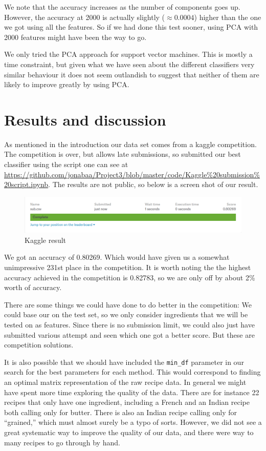 \documentclass[parskip=half]{scrartcl}
\theoremstyle{definition}
\theoremstyle{remark}
\newcommand{\funcname}[1]{{\color{blue}{\texttt{#1}}}}
\newcommand{\varname}[1]{\texttt{#1}}
\begin{document}
We note that the accuracy increases as the number of components goes up.
However, the accuracy at 2000 is actually slightly ($\approx 0.0004$) higher than the one we got using all the features.
So if we had done this test sooner, using PCA with 2000 features might have been the way to go. 

We only tried the PCA approach for support vector machines. 
This is mostly a time constraint, but given what we have seen about the different classifiers very similar behaviour it does not seem outlandish to suggest that neither of them are likely to improve greatly by using PCA.

\section{Results and discussion} \label{sec:results}

As mentioned in the introduction our data set comes from a kaggle competition. 
The competition is over, but allows late submissions, so submitted our best classifier using the script one can see at \url{https://github.com/jonabaa/Project3/blob/master/code/Kaggle%20submission%20script.ipynb}. 
The results are not public, so below is a screen shot of our result.

\begin{figure}[H]
\caption{Kaggle result} \label{fig:kaggleresult}
\centering
\includegraphics[scale=0.3]{images/kaggle_result.png}
\end{figure}

We got an accuracy of 0.80269. 
Which would have given us a somewhat unimpressive 231st place in the competition. 
It is worth noting the the highest accuracy achieved in the competition is 0.82783, so we are only off by about 2\% worth of accuracy.

There are some things we could have done to do better in the competition:
We could base our \funcname{CountVectorizer} on the test set, so we only consider ingredients that we will be tested on as features. 
Since there is no submission limit, we could also just have submitted various attempt and seen which one got a better score.
But these are competition solutions. 

It is also possible that we should have included the \varname{min\_df} parameter in our search for the best parameters for each method. 
This would correspond to finding an optimal matrix representation of the raw recipe data.  
In general we might have spent more time exploring the quality of the data. 
There are for instance 22 recipes that only have one ingredient, including a French and an Indian recipe both calling only for butter. 
There is also an Indian recipe calling only for ``grained,'' which must almost surely be a typo of sorts. 
However, we did not see a great systematic way to improve the quality of our data, and there were way to many recipes to go through by hand. 
\end{document}
